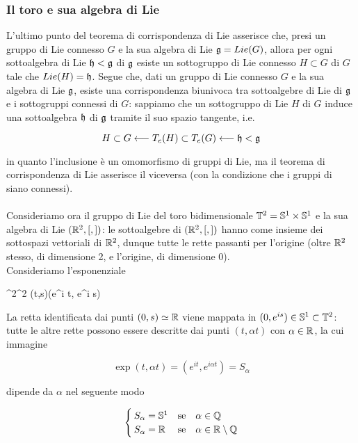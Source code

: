 \subsubsection{Il toro e sua algebra di Lie}

L'ultimo punto del teorema di corrispondenza di Lie asserisce che, presi un gruppo di Lie connesso $ G $ e la sua algebra di Lie $ \mathfrak{g} = Lie(G) $, allora per ogni sottoalgebra di Lie $ \mathfrak{h} < \mathfrak{g} $ di $ \mathfrak{g} $ esiste un sottogruppo di Lie connesso $ H \subset G $ di $ G $ tale che $ Lie(H) = \mathfrak{h} $. Segue che, dati un gruppo di Lie connesso $ G $ e la sua algebra di Lie $ \mathfrak{g} $, esiste una corrispondenza biunivoca tra sottoalgebre di Lie di $ \mathfrak{g} $ e i sottogruppi connessi di $ G $: sappiamo che un sottogruppo di Lie $ H $ di $ G $ induce una sottoalgebra $ \mathfrak{h} $ di $ \mathfrak{g} $ tramite il suo spazio tangente, i.e.

\begin{equation}
	H \subset G \longleftarrow T_{e}(H) \subset T_{e}(G) \longleftarrow \mathfrak{h} < \mathfrak{g}
\end{equation}

in quanto l'inclusione è un omomorfismo di gruppi di Lie, ma il teorema di corrispondenza di Lie asserisce il viceversa (con la condizione che i gruppi di siano connessi).\\\\
%
Consideriamo ora il gruppo di Lie del toro bidimensionale $ \mathbb{T}^{2} = \mathbb{S}^{1} \times \mathbb{S}^{1} $ e la sua algebra di Lie $ (\mathbb{R}^{2},[,]) $: le sottoalgebre di $ (\mathbb{R}^{2},[,]) $ hanno come insieme dei sottospazi vettoriali di $ \mathbb{R}^{2} $, dunque tutte le rette passanti per l'origine (oltre $ \mathbb{R}^{2} $ stesso, di dimensione 2, e l'origine, di dimensione 0).\\
Consideriamo l'esponenziale

\map{\exp}
	{\R^{2}}{\T^{2}}
	{(t,s)}{(e^{i t}, e^{i s})}

La retta identificata dai punti $ (0,s) \simeq \mathbb{R} $ viene mappata in $ (0,e^{i s}) \in \mathbb{S}^{1} \subset \mathbb{T}^{2} $: tutte le altre rette possono essere descritte dai punti $ (t,\alpha t) $ con $ \alpha \in \mathbb{R} $, la cui immagine

\begin{equation}
	\exp(t,\alpha t) = (e^{i t}, e^{i \alpha t}) = S_{\alpha}
\end{equation}

dipende da $ \alpha $ nel seguente modo

\begin{equation}
	\begin{cases}
		S_{\alpha} = \S^{1} & \qq*{se} \alpha \in \Q \\
		S_{\alpha} = \R & \qq*{se} \alpha \in \R \setminus \Q
	\end{cases}
\end{equation}

